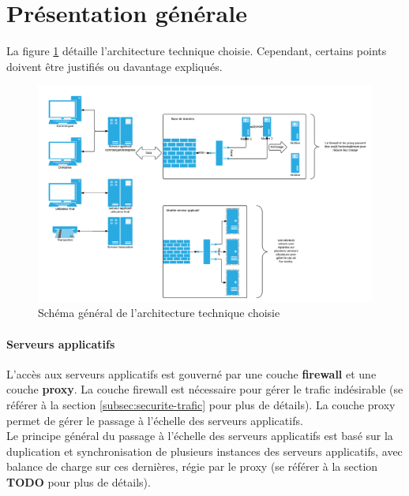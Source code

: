 




\section{Présentation générale}

La figure \ref{fig:network} détaille l'architecture technique choisie.
Cependant, certains points doivent être justifiés ou davantage expliqués.

\begin{landscape}
  \begin{figure}[htpb]
      \centering
      \includegraphics[width=0.7\paperheight]{network}
      \caption{Schéma général de l'architecture technique choisie}
      \label{fig:network}
  \end{figure}
\end{landscape}

\paragraph{Serveurs applicatifs}

L'accès aux serveurs applicatifs est gouverné par une couche \textbf{firewall}
et une couche \textbf{proxy}. La couche firewall est nécessaire pour gérer le
trafic indésirable (se référer à la section
\ref{subsec:securite-trafic} pour plus de détails). La couche proxy
permet de gérer le passage à l'échelle des serveurs applicatifs. \\

Le principe général du passage à l'échelle des serveurs applicatifs est basé
sur la duplication et synchronisation de plusieurs instances des serveurs
applicatifs, avec balance de charge sur ces dernières, régie par le proxy (se
référer à la section {\huge \textbf{TODO} } pour plus de détails).

